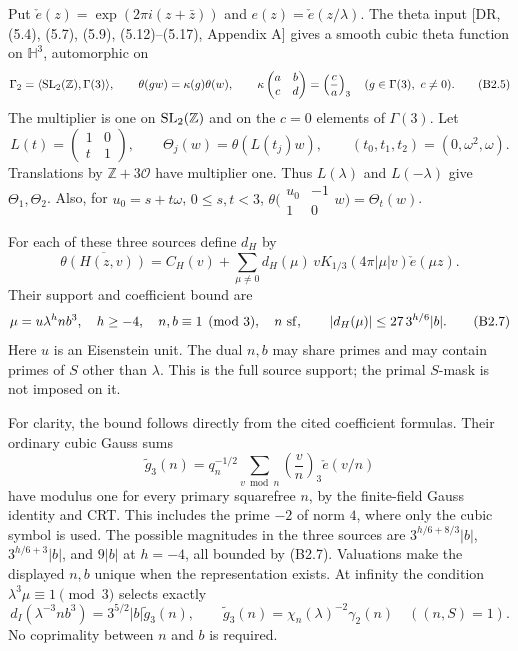 \documentclass[11pt,a4paper]{article}
\begin{document}
Put \(\check e(z)=\exp(2\pi i(z+\bar z))\) and
\(e(z)=\check e(z/\lambda)\). The theta input {[}DR, (5.4), (5.7),
(5.9), (5.12)--(5.17), Appendix A{]} gives a smooth cubic theta function
on \(\mathbb H^3\), automorphic on \[
\Gamma_2=\langle {\rm SL}_2(\mathbb Z),\Gamma(3)\rangle,\qquad
\theta(gw)=\kappa(g)\theta(w),\qquad
\kappa\begin{pmatrix}a&b\\c&d\end{pmatrix}
=\left(\frac ca\right)_3\quad(g\in\Gamma(3),\ c\ne0).
\tag{B2.5}
\] The multiplier is one on \({\rm SL}_2(\mathbb Z)\) and on the \(c=0\)
elements of \(\Gamma(3)\). Let \[
L(t)=\begin{pmatrix}1&0\\t&1\end{pmatrix},\qquad
\Theta_j(w)=\theta(L(t_j)w),\qquad
(t_0,t_1,t_2)=(0,\omega^2,\omega).
\] Translations by \(\mathbb Z+3\mathcal O\) have multiplier one. Thus
\(L(\lambda)\) and \(L(-\lambda)\) give \(\Theta_1,\allowbreak{}\Theta_2\). Also, for
\(u_0=s+t\omega\), \(0\le s,\allowbreak{}t<3\),
\(\theta\bigl(\begin{smallmatrix}u_0&-1\\1&0\end{smallmatrix}w\bigr)=\Theta_t(w)\).

For each of these three sources define \(d_H\) by \[
\overline{\theta(H(z,v))}
=C_H(v)+\sum_{\mu\ne0}d_H(\mu)\,vK_{1/3}(4\pi|\mu|v)\check e(\mu z).
\tag{B2.6}
\] Their support and coefficient bound are \[
\mu=u\lambda^h nb^3,\quad h\ge-4,\quad n,b\equiv1\pmod3,\quad n\ {\rm sf},
\qquad |d_H(\mu)|\le27\,3^{h/6}|b|.
\tag{B2.7}
\] Here \(u\) is an Eisenstein unit. The dual \(n,\allowbreak{}b\) may share primes
and may contain primes of \(S\) other than \(\lambda\). This is the full
source support; the primal \(S\)-mask is not imposed on it.

For clarity, the bound follows directly from the cited coefficient
formulas. Their ordinary cubic Gauss sums \[
\widetilde g_3(n)=q_n^{-1/2}\sum_{v\bmod n}\left(\frac vn\right)_3\check e(v/n)
\] have modulus one for every primary squarefree \(n\), by the
finite-field Gauss identity and CRT. This includes the prime \(-2\) of
norm \(4\), where only the cubic symbol is used. The possible magnitudes
in the three sources are \(3^{h/6+8/3}|b|\), \(3^{h/6+3}|b|\), and
\(9|b|\) at \(h=-4\), all bounded by (B2.7). Valuations make the
displayed \(n,\allowbreak{}b\) unique when the representation exists. At infinity the
condition \(\lambda^3\mu\equiv1\pmod3\) selects exactly \[
d_I(\lambda^{-3}nb^3)=3^{5/2}|b|\widetilde g_3(n),\qquad
\widetilde g_3(n)=\chi_n(\lambda)^{-2}\gamma_2(n)\quad((n,S)=1).
\tag{B2.8}
\] No coprimality between \(n\) and \(b\) is required.
\end{document}
